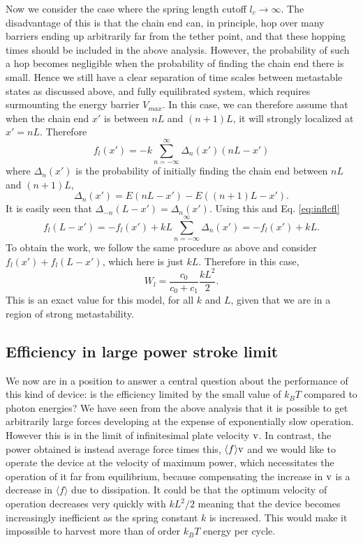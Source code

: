 \documentclass[journal = mamobx, manuscript = article]{achemso}
\begin{document}
Now we consider the case where the spring length cutoff $l_c \rightarrow \infty$. The
disadvantage of this is that the chain end can, in principle, hop over many
barriers ending up arbitrarily far from the tether point, and that these hopping
times should be included in the above analysis. However, the probability of such
a hop becomes negligible when the probability of finding the chain end there is small. Hence we
still have a clear separation of time scales between metastable states as
discussed above, and fully equilibrated system, which requires surmounting the
energy barrier $V_{max}$. In this case, we can therefore assume that when the
chain end $x'$ is between $nL$ and $(n+1)L$, it will strongly localized at $x' = nL$. 
Therefore 
\begin{equation}
\label{eq:inflcfl}
f_l(x') = -k \sum_{n=-\infty}^\infty \Delta_n(x') (nL-x')
\end{equation}
where $\Delta_n(x')$ is the probability of initially finding the chain end
between $nL$ and $(n+1)L$, 
\begin{equation}
\Delta_n(x') = E(nL-x')-E((n+1)L-x').
\end{equation}
It is easily seen that $\Delta_{-n}(L-x') = \Delta_n(x')$. Using this and Eq. \ref{eq:inflcfl}
\begin{equation}
f_l(L-x') = -f_l(x') +kL \sum_{n=-\infty}^\infty \Delta_n(x') =  -f_l(x') +kL  .
\end{equation}
To obtain the work, we follow the same procedure as above and consider $f_l(x') + f_l(L-x')$, which
here is just $kL$. Therefore in this case,
\begin{equation}
W_l = \frac{c_0}{c_0+c_1} \frac{k L^2}{2}.
\end{equation}
This is an exact value for this model, for all $k$ and $L$, given that we are in a region
of strong metastability.

\subsection{Efficiency in large power stroke limit}
\label{sec:EILPSL}
We now are in a position to answer a central question about the performance of
this kind of device: is the efficiency limited by the small value of $k_B T$
compared to photon energies? We have seen from the above analysis that it is
possible to get arbitrarily large forces developing at the expense of
exponentially slow operation. However this is in the limit of infinitesimal
plate velocity $\rm v$. In contrast, the power obtained is instead average
force times this, $\langle f\rangle {\rm v}$ and we would like to operate the
device at the velocity of maximum power, which necessitates the operation of it
far from equilibrium, because compensating the increase in $\rm v$ is a
decrease in $\langle f\rangle$ due to dissipation. It could be that the optimum velocity of operation
decreases very quickly with $k L^2/2$ meaning that the device becomes
increasingly inefficient as the spring constant $k$ is increased. This would
make it impossible to harvest more than of order $k_B T$ energy per cycle.
\end{document}
